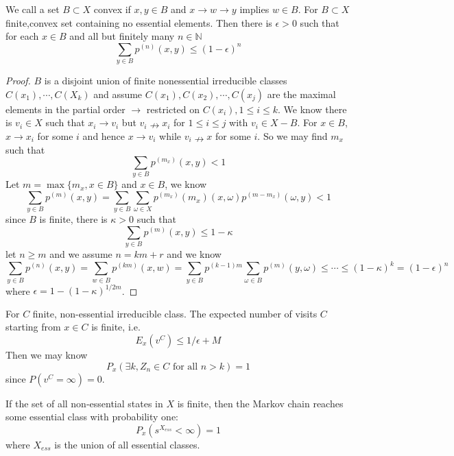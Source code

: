 \documentclass[lang=en,11pt,a4paper,citestyle =authoryear]{elegantpaper}
\newcommand{\N}{\mathbb{N}}
\begin{document}
\begin{lemma}
    We call a set $B\subset X$ convex if $x,y \in B$ and $x\to w\to y$ implies $w\in B$. For $B\subset X$ finite,convex set containing no essential elements. Then there is $\epsilon > 0$ such that for each $x\in B$ and all but finitely many $n\in \N$
    \[
    \sum\limits_{y\in B}p^{(n)}(x,y) \leq (1-\epsilon)^n
    \]
\end{lemma}
\begin{proof}
    $B$ is a disjoint union of finite nonessential irreducible classes $C(x_1),\cdots,C(X_k)$ and assume $C(x_1),C(x_2),\cdots,C(x_j)$ are the maximal elements in the partial order $\to$ restricted on $C(x_i), 1\leq i\leq k$. We know there is $v_i \in X$ such that $x_i \to v_i$ but $v_i \nrightarrow x_i$ for $1\leq i \leq j$ with $v_i \in X - B$. For $x\in B$, $x\to x_i$ for some $i$ and hence $x\to v_i$ while $v_i \nrightarrow x$ for some $i$. So we may find $m_x$ such that
    \[\sum_{y\in B} p^{(m_x)}(x,y) < 1\]
    Let $ m = \max\{m_x, x\in B\}$ and $x\in B$, we know
    \[
    \sum\limits_{y\in B}p^{(m)}(x,y) = \sum\limits_{y\in B}\sum\limits_{\omega \in X}p^{(m_x)}(m_x)(x,\omega)p^{(m-m_x)}(\omega,y) < 1
    \]
    since $B$ is finite, there is $\kappa > 0$ such that
    \[
    \sum_{y\in B}p^{(m)}(x,y) \leq 1-\kappa
    \]
    let $n \geq m$ and we assume $n = km +r$ and we know
    \[
    \sum\limits_{y\in B}p^{(n)}(x,y) = \sum\limits_{w\in B}p^{(km)}(x,w) = \sum\limits_{y\in B}p^{(k-1)m}\sum\limits_{\omega \in B}p^{(m)}(y,\omega) \leq \cdots \leq (1-\kappa)^k = (1-\epsilon)^n
    \]
    where $\epsilon = 1 - (1-\kappa)^{1/2m}$.
\end{proof}

\begin{lemma}
    For $C$ finite, non-essential irreducible class. The expected number of visits $C$ starting from $x\in C$ is finite, i.e.
    \[
    E_x(v^C) \leq 1/\epsilon +M
    \]
    Then we may know
    \[P_x(\exists k, Z_n \in C\text{ for all }n>k) = 1\]
    since $P(v^C = \infty) = 0$.
\end{lemma}

\begin{lemma}
    If the set of all non-essential states in $X$ is finite, then the Markov chain reaches some essential class with probability one:
    \[P_x(s^{X_{ess}}<\infty) = 1\]
    where $X_{ess}$ is the union of all essential classes.
\end{lemma}
\end{document}
